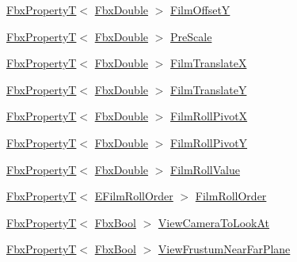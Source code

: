 \begin{DoxyCompactItemize}
\item 
\hyperlink{class_fbx_property_t}{Fbx\+PropertyT}$<$ \hyperlink{fbxtypes_8h_a171e72a1c46fc15c1a6c9c31948c1c5b}{Fbx\+Double} $>$ \hyperlink{class_fbx_camera_a244464e212906b44d5f827a8cdba0444}{Film\+OffsetY}
\item 
\hyperlink{class_fbx_property_t}{Fbx\+PropertyT}$<$ \hyperlink{fbxtypes_8h_a171e72a1c46fc15c1a6c9c31948c1c5b}{Fbx\+Double} $>$ \hyperlink{class_fbx_camera_ace6cbe41faef53ac2dc02dec31d395a4}{Pre\+Scale}
\item 
\hyperlink{class_fbx_property_t}{Fbx\+PropertyT}$<$ \hyperlink{fbxtypes_8h_a171e72a1c46fc15c1a6c9c31948c1c5b}{Fbx\+Double} $>$ \hyperlink{class_fbx_camera_af0c221000e5299efd1e91408bb4d96b6}{Film\+TranslateX}
\item 
\hyperlink{class_fbx_property_t}{Fbx\+PropertyT}$<$ \hyperlink{fbxtypes_8h_a171e72a1c46fc15c1a6c9c31948c1c5b}{Fbx\+Double} $>$ \hyperlink{class_fbx_camera_ab2fed4f94b108161a382cb53ecc9bc14}{Film\+TranslateY}
\item 
\hyperlink{class_fbx_property_t}{Fbx\+PropertyT}$<$ \hyperlink{fbxtypes_8h_a171e72a1c46fc15c1a6c9c31948c1c5b}{Fbx\+Double} $>$ \hyperlink{class_fbx_camera_af8db195197a3f0a6729533842e00fd18}{Film\+Roll\+PivotX}
\item 
\hyperlink{class_fbx_property_t}{Fbx\+PropertyT}$<$ \hyperlink{fbxtypes_8h_a171e72a1c46fc15c1a6c9c31948c1c5b}{Fbx\+Double} $>$ \hyperlink{class_fbx_camera_ab3034aa3a13b537c6542d8b45aa77eae}{Film\+Roll\+PivotY}
\item 
\hyperlink{class_fbx_property_t}{Fbx\+PropertyT}$<$ \hyperlink{fbxtypes_8h_a171e72a1c46fc15c1a6c9c31948c1c5b}{Fbx\+Double} $>$ \hyperlink{class_fbx_camera_a80affb53985e548f42136ccd3b9d7a2e}{Film\+Roll\+Value}
\item 
\hyperlink{class_fbx_property_t}{Fbx\+PropertyT}$<$ \hyperlink{class_fbx_camera_a831d9b7ffcbf3611715eb2ad9108870b}{E\+Film\+Roll\+Order} $>$ \hyperlink{class_fbx_camera_ac7583ff2d3c73fa3e4f514ba29504be5}{Film\+Roll\+Order}
\item 
\hyperlink{class_fbx_property_t}{Fbx\+PropertyT}$<$ \hyperlink{fbxtypes_8h_a92e0562b2fe33e76a242f498b362262e}{Fbx\+Bool} $>$ \hyperlink{class_fbx_camera_a9c44e5ed7154bb5b69664bbe4e7a7f51}{View\+Camera\+To\+Look\+At}
\item 
\hyperlink{class_fbx_property_t}{Fbx\+PropertyT}$<$ \hyperlink{fbxtypes_8h_a92e0562b2fe33e76a242f498b362262e}{Fbx\+Bool} $>$ \hyperlink{class_fbx_camera_aaf010c106bab5fca32acadc0b97d8437}{View\+Frustum\+Near\+Far\+Plane}
\item 

\end{DoxyCompactItemize}
